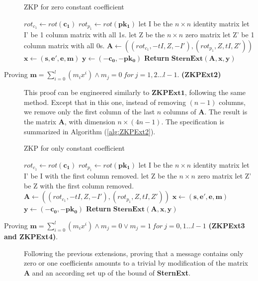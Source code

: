 \begin{description}
  \begin{algorithm}
    \caption{ZKP for zero constant coefficient}\label{alg:ZKPExt1}
    \begin{algorithmic}[1]
      \State $rot_{c_1} \gets rot(\mathbf{c_1})$
      \State $rot_{p_1} \gets rot(\mathbf{pk_1})$
      \State let I be the $n \times n$ identity matrix
      \State let I' be 1 column matrix with all 1s.
      \State let Z be the $n \times n $ zero matrix
      \State let Z' be 1 column matrix with all 0s.
      \State $\mathbf{A} \gets ((rot_{c_1},-tI, Z, -I'),(rot_{p_1}, Z, tI,Z')) $
      \State $\mathbf{x} \gets (\mathbf{s, e', e, m})$
      \State $\mathbf{y} \gets (\mathbf{-c_0, -pk_0})$
      \State \textbf{Return} $\mathbf{SternExt(A,x,y)}$
      \EndProcedure
    \end{algorithmic}
  \end{algorithm}

\item[Proving $\mathbf{m}=\sum_{i = 0}^l(m_ix^i) \land m_j = 0\  for\  j = 1,2
  \dots l-1$. \textbf{(ZKPExt2)}] This proof can be engineered similarly to $\mathbf{ZKPExt1}$, following
  the same method. Except that in this one, instead of removing $(n-1)$ columns, we
  remove only the first column of the last $n$ columns of $\mathbf{A}$. The result
  is the matrix $\mathbf{A}$, with dimension $n \times (4n-1)$. The specification is summarized in Algorithm (\ref{alg:ZKPExt2}).
  \begin{algorithm}
    \caption{ZKP for only constant coefficient}\label{alg:ZKPExt2}
    \begin{algorithmic}[1]
      \State $rot_{c_1} \gets rot(\mathbf{c_1})$
      \State $rot_{p_1} \gets rot(\mathbf{pk_1})$
      \State let I be the $n \times n$ identity matrix
      \State let I' be I with the first column removed.
      \State let Z be the $n \times n $ zero matrix
      \State let Z' be Z with the first column removed.
      \State $\mathbf{A} \gets ((rot_{c_1},-tI, Z, -I'),(rot_{p_1}, Z, tI,Z')) $
      \State $\mathbf{x} \gets (\mathbf{s, e', e, m})$
      \State $\mathbf{y} \gets (\mathbf{-c_0, -pk_0})$
      \State \textbf{Return} $\mathbf{SternExt(A,x,y)}$
      \EndProcedure
    \end{algorithmic}
  \end{algorithm}


\item[Proving $\mathbf{m}=\sum_{i = 0}^l(m_ix^i) \land m_j = 0 \lor m_j = 1\  for \  j = 0,1
  \dots l-1$ \textbf{(ZKPExt3 and ZKPExt4)}. ] Following the previous extensions, proving that a message
  contains only zero or one coefficients amounts to a trivial by modification of the matrix $\mathbf{A}$ and an according set up of the bound of
  \textbf{SternExt}.
\end{description}

